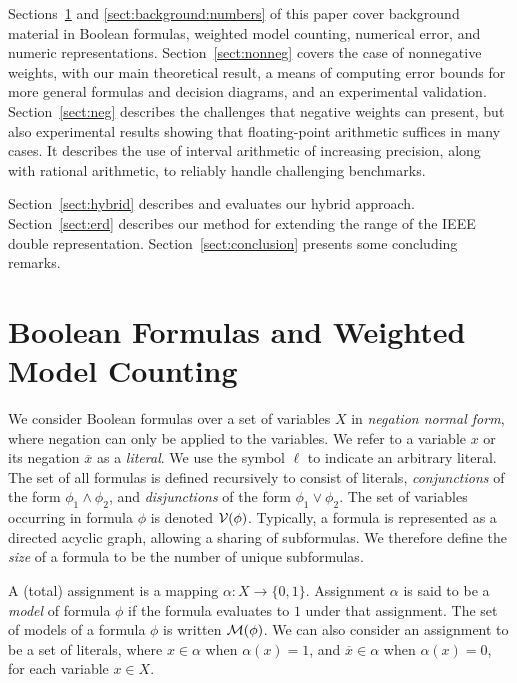 \documentclass{easychair}
\newcommand{\obar}[1]{\overline{#1}}
\newcommand{\lit}{\ell}
\newcommand{\varset}{X}
\newcommand{\dependencyset}{{\cal V}}
\newcommand{\assign}{\alpha}
\newcommand{\modelset}{{\cal M}}
\begin{document}
Sections~\ref{sect:background:boolean} and
\ref{sect:background:numbers} of this paper cover background material
in Boolean formulas, weighted model counting, numerical error, and
numeric representations.  Section~\ref{sect:nonneg} covers the case of
nonnegative weights, with our main theoretical result, a means of
computing error bounds for more general formulas and decision
diagrams, and an experimental validation.  Section~\ref{sect:neg}
describes the challenges that negative weights can present, but also
experimental results showing that floating-point arithmetic suffices
in many cases.  It describes the use of interval arithmetic of
increasing precision, along with rational arithmetic, to reliably
handle challenging benchmarks.

Section~\ref{sect:hybrid} describes and evaluates our hybrid approach.
Section~\ref{sect:erd} describes our method for extending the range of the IEEE double representation.
Section~\ref{sect:conclusion}  presents some concluding remarks.


\section{Boolean Formulas and Weighted Model Counting}
\label{sect:background:boolean}

We consider Boolean formulas over a set of variables $\varset$ in
\emph{negation normal form}, where negation can only be applied to the
variables.  We refer to a variable $x$ or its negation $\obar{x}$ as a
\emph{literal}.  We use the symbol $\lit$ to indicate an arbitrary
literal.  The set of all formulas is defined recursively to consist of
literals, \emph{conjunctions} of the form $\phi_1 \land \phi_2$, and
\emph{disjunctions} of the form $\phi_1 \lor \phi_2$.  The set of
variables occurring in formula $\phi$ is denoted
$\dependencyset(\phi)$.  Typically, a formula is represented as a
directed acyclic graph, allowing a sharing of subformulas.  We
therefore define the \emph{size} of a formula to be the number of
unique subformulas.

A (total) assignment is a mapping $\assign \colon \varset \rightarrow
\{0, 1\}$.  Assignment $\assign$ is said to be a \emph{model} of
formula $\phi$ if the formula evaluates to $1$ under that assignment.
The set of models of a formula $\phi$ is written $\modelset(\phi)$.
We can also consider an assignment to be a set of literals, where $x \in \assign$
when $\assign(x) = 1$, and $\obar{x} \in \assign$ when
$\assign(x) = 0$, for each variable $x \in \varset$.
\end{document}
